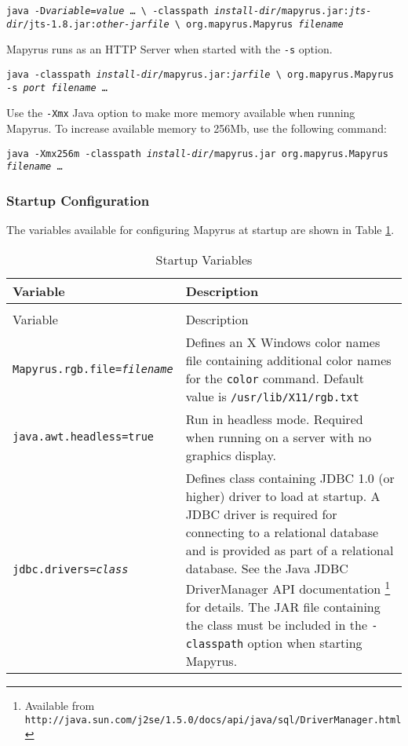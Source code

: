 \begin{alltt}
\texttt{java -D\textit{variable}=\textit{value} \dots\ \textbackslash
  -classpath \textit{install-dir}/mapyrus.jar:\textit{jts-dir}/jts-1.8.jar:\textit{other-jarfile} \textbackslash
  org.mapyrus.Mapyrus \textit{filename}}
\end{alltt}

Mapyrus runs as an HTTP Server when started with the
\texttt{-s} option.

\begin{alltt}
\texttt{java -classpath \textit{install-dir}/mapyrus.jar:\textit{jarfile} \textbackslash
  org.mapyrus.Mapyrus -s \textit{port} \textit{filename} \dots}
\end{alltt}

\label{morememory}
Use the
\texttt{-Xmx} Java option
to make more memory available when running Mapyrus.
To increase available memory to 256Mb, use the following command:

\begin{alltt}
\texttt{java -Xmx256m -classpath \textit{install-dir}/mapyrus.jar org.mapyrus.Mapyrus \textit{filename} \dots}
\end{alltt}

\subsubsection{Startup Configuration}

The variables available for configuring Mapyrus at startup are
shown in Table \ref{startupvariables}.

\begin{longtable}{|l|p{7cm}|}
\hline
\label{startupvariables}
Variable & Description \\
\hline
\hline
\endfirsthead
\hline
\caption{Startup Variables} \\
\endfoot

\hline
Variable & Description \\
\hline
\hline
\endhead

\texttt{Mapyrus.rgb.file=\textit{filename}} &
Defines an X Windows color names file containing additional color names
for the
\texttt{color} command.  Default value is
\texttt{/usr/lib/X11/rgb.txt} \\

\hline

\texttt{java.awt.headless=true} &
Run in headless mode.  Required when running on a server
with no graphics display. \\

\hline

\texttt{jdbc.drivers=\textit{class}} &
Defines class containing JDBC 1.0 (or higher) driver to load at startup.
A JDBC driver is required for connecting to a relational database and
is provided as part of a relational database.
See the Java JDBC DriverManager API documentation
\footnote{Available from \texttt{http://java.sun.com/j2se/1.5.0/docs/api/java/sql/DriverManager.html}}
for details.
The JAR file containing the class must be included in the \texttt{-classpath}
option when starting Mapyrus. \\

\hline
\end{longtable}


